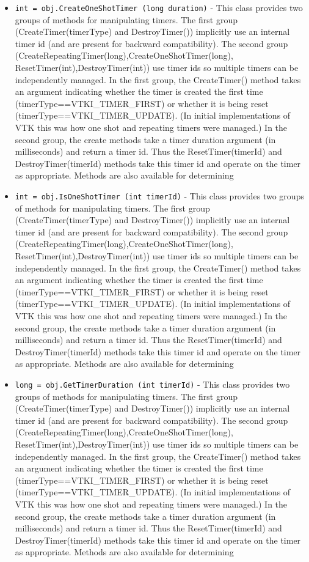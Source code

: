 \begin{itemize}
\item  \verb|int = obj.CreateOneShotTimer (long duration)| -  This class provides two groups of methods for manipulating timers.  The
 first group (CreateTimer(timerType) and DestroyTimer()) implicitly use
 an internal timer id (and are present for backward compatibility). The
 second group (CreateRepeatingTimer(long),CreateOneShotTimer(long),
 ResetTimer(int),DestroyTimer(int)) use timer ids so multiple timers can
 be independently managed. In the first group, the CreateTimer() method
 takes an argument indicating whether the timer is created the first time
 (timerType==VTKI\_TIMER\_FIRST) or whether it is being reset
 (timerType==VTKI\_TIMER\_UPDATE). (In initial implementations of VTK this
 was how one shot and repeating timers were managed.) In the second
 group, the create methods take a timer duration argument (in
 milliseconds) and return a timer id. Thus the ResetTimer(timerId) and
 DestroyTimer(timerId) methods take this timer id and operate on the
 timer as appropriate. Methods are also available for determining

\item  \verb|int = obj.IsOneShotTimer (int timerId)| -  This class provides two groups of methods for manipulating timers.  The
 first group (CreateTimer(timerType) and DestroyTimer()) implicitly use
 an internal timer id (and are present for backward compatibility). The
 second group (CreateRepeatingTimer(long),CreateOneShotTimer(long),
 ResetTimer(int),DestroyTimer(int)) use timer ids so multiple timers can
 be independently managed. In the first group, the CreateTimer() method
 takes an argument indicating whether the timer is created the first time
 (timerType==VTKI\_TIMER\_FIRST) or whether it is being reset
 (timerType==VTKI\_TIMER\_UPDATE). (In initial implementations of VTK this
 was how one shot and repeating timers were managed.) In the second
 group, the create methods take a timer duration argument (in
 milliseconds) and return a timer id. Thus the ResetTimer(timerId) and
 DestroyTimer(timerId) methods take this timer id and operate on the
 timer as appropriate. Methods are also available for determining

\item  \verb|long = obj.GetTimerDuration (int timerId)| -  This class provides two groups of methods for manipulating timers.  The
 first group (CreateTimer(timerType) and DestroyTimer()) implicitly use
 an internal timer id (and are present for backward compatibility). The
 second group (CreateRepeatingTimer(long),CreateOneShotTimer(long),
 ResetTimer(int),DestroyTimer(int)) use timer ids so multiple timers can
 be independently managed. In the first group, the CreateTimer() method
 takes an argument indicating whether the timer is created the first time
 (timerType==VTKI\_TIMER\_FIRST) or whether it is being reset
 (timerType==VTKI\_TIMER\_UPDATE). (In initial implementations of VTK this
 was how one shot and repeating timers were managed.) In the second
 group, the create methods take a timer duration argument (in
 milliseconds) and return a timer id. Thus the ResetTimer(timerId) and
 DestroyTimer(timerId) methods take this timer id and operate on the
 timer as appropriate. Methods are also available for determining


\end{itemize}
